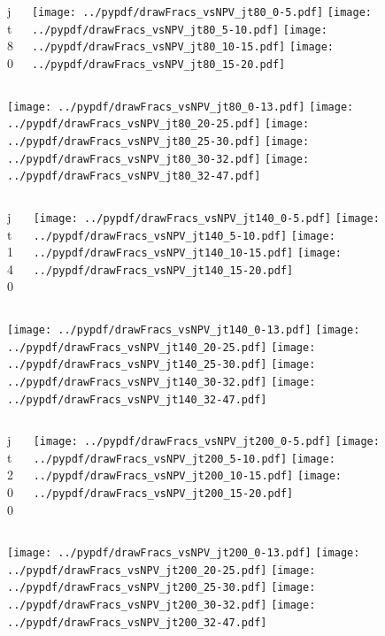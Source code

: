 \documentclass[aspectratio=169]{beamer}
\begin{document}
\begin{figure}[p]
\flushleft
\begin{columns}[T]
\begin{column}{.2\linewidth}
\centering
jt80
\end{column}
\begin{column}{.8\linewidth}
\texttt{[image: ../pypdf/drawFracs\_vsNPV\_jt80\_0-5.pdf]}
\texttt{[image: ../pypdf/drawFracs\_vsNPV\_jt80\_5-10.pdf]}
\texttt{[image: ../pypdf/drawFracs\_vsNPV\_jt80\_10-15.pdf]}
\texttt{[image: ../pypdf/drawFracs\_vsNPV\_jt80\_15-20.pdf]}
\end{column}
\end{columns}
\texttt{[image: ../pypdf/drawFracs\_vsNPV\_jt80\_0-13.pdf]}
\texttt{[image: ../pypdf/drawFracs\_vsNPV\_jt80\_20-25.pdf]}
\texttt{[image: ../pypdf/drawFracs\_vsNPV\_jt80\_25-30.pdf]}
\texttt{[image: ../pypdf/drawFracs\_vsNPV\_jt80\_30-32.pdf]}
\texttt{[image: ../pypdf/drawFracs\_vsNPV\_jt80\_32-47.pdf]}
\end{figure}

\begin{figure}[p]
\flushleft
\begin{columns}[T]
\begin{column}{.2\linewidth}
\centering
jt140
\end{column}
\begin{column}{.8\linewidth}
\texttt{[image: ../pypdf/drawFracs\_vsNPV\_jt140\_0-5.pdf]}
\texttt{[image: ../pypdf/drawFracs\_vsNPV\_jt140\_5-10.pdf]}
\texttt{[image: ../pypdf/drawFracs\_vsNPV\_jt140\_10-15.pdf]}
\texttt{[image: ../pypdf/drawFracs\_vsNPV\_jt140\_15-20.pdf]}
\end{column}
\end{columns}
\texttt{[image: ../pypdf/drawFracs\_vsNPV\_jt140\_0-13.pdf]}
\texttt{[image: ../pypdf/drawFracs\_vsNPV\_jt140\_20-25.pdf]}
\texttt{[image: ../pypdf/drawFracs\_vsNPV\_jt140\_25-30.pdf]}
\texttt{[image: ../pypdf/drawFracs\_vsNPV\_jt140\_30-32.pdf]}
\texttt{[image: ../pypdf/drawFracs\_vsNPV\_jt140\_32-47.pdf]}
\end{figure}

\begin{figure}[p]
\flushleft
\begin{columns}[T]
\begin{column}{.2\linewidth}
\centering
jt200
\end{column}
\begin{column}{.8\linewidth}
\texttt{[image: ../pypdf/drawFracs\_vsNPV\_jt200\_0-5.pdf]}
\texttt{[image: ../pypdf/drawFracs\_vsNPV\_jt200\_5-10.pdf]}
\texttt{[image: ../pypdf/drawFracs\_vsNPV\_jt200\_10-15.pdf]}
\texttt{[image: ../pypdf/drawFracs\_vsNPV\_jt200\_15-20.pdf]}
\end{column}
\end{columns}
\texttt{[image: ../pypdf/drawFracs\_vsNPV\_jt200\_0-13.pdf]}
\texttt{[image: ../pypdf/drawFracs\_vsNPV\_jt200\_20-25.pdf]}
\texttt{[image: ../pypdf/drawFracs\_vsNPV\_jt200\_25-30.pdf]}
\texttt{[image: ../pypdf/drawFracs\_vsNPV\_jt200\_30-32.pdf]}
\texttt{[image: ../pypdf/drawFracs\_vsNPV\_jt200\_32-47.pdf]}
\end{figure}
\end{document}
